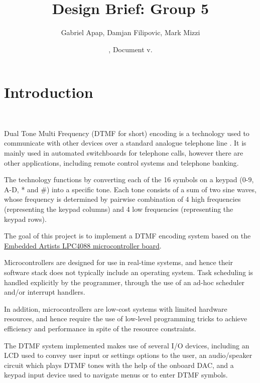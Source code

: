 \documentclass[11pt,a4paper,twocolumn]{scrartcl}
\title{Design Brief: Group 5}
\author{
   Gabriel Apap,
   Damjan Filipovic,
   Mark Mizzi
   }
\date{\svnMaxToday, Document v.\svnInfoMaxRevision}
\begin{document}
\maketitle


\section{Introduction}~\label{introduction}

   Dual Tone Multi Frequency (DTMF for short) encoding is a technology used to communicate with other devices over a standard analogue telephone line \cite{sl:an218}. It is mainly used in automated switchboards for telephone calls, however there are other applications, including remote control systems and telephone banking\cite{sl:an218}.

   The technology functions by converting each of the 16 symbols on a keypad ($0$-$9$, A-D, * and \#) into a specific tone. Each tone consists of a sum of two sine waves, whose frequency is determined by pairwise combination of 4 high frequencies (representing the keypad columns) and 4 low frequencies (representing the keypad rows)\cite{sl:an218}.

   The goal of this project is to implement a DTMF encoding system based on the \href{https://www.embeddedartists.com/products/lpc4088-quickstart-board/}{Embedded Artists LPC4088 microcontroller board}.

   Microcontrollers are designed for use in real-time systems, and hence their software stack does not typically include an operating system. Task scheduling is handled explicitly by the programmer, through the use of an ad-hoc scheduler and/or interrupt handlers.

   In addition, microcontrollers are low-cost systems with limited hardware resources, and hence require the use of low-level programming tricks to achieve efficiency and performance in spite of the resource constraints.
   
   The DTMF system implemented makes use of several I/O devices, including an LCD used to convey user input or settings options to the user,
   an audio/speaker circuit which plays DTMF tones with the help of the onboard DAC, and a keypad input device used to navigate menus or to enter DTMF symbols.
\end{document}
